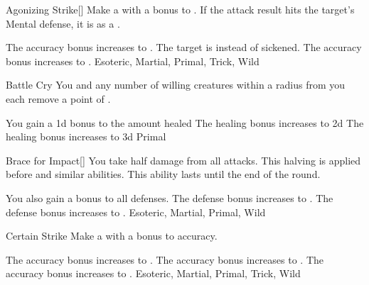 
\lowercase{\hypertarget{maneuver:Agonizing Strike}{}}\label{maneuver:Agonizing Strike}
\hypertarget{maneuver:Agonizing Strike}{}
\begin{apability}{Agonizing Strike}[]
Make a  with a  bonus to .
If the attack result hits the target's Mental defense,
it is  as a .

\rankline
{} The accuracy bonus increases to .
 The target is  instead of sickened.
 The accuracy bonus increases to .
 Esoteric, Martial, Primal, Trick, Wild
\end{apability}
\vspace{0.25em}



\lowercase{\hypertarget{maneuver:Battle Cry}{}}\label{maneuver:Battle Cry}
\hypertarget{maneuver:Battle Cry}{}
\begin{apability}{Battle Cry}
You and any number of willing creatures within a \arealarge radius from you
each remove a point of .

\rankline
{} You gain a \plus1d bonus to the amount healed
 The healing bonus increases to \plus2d
 The healing bonus increases to \plus3d
 Primal
\end{apability}
\vspace{0.25em}



\lowercase{\hypertarget{maneuver:Brace for Impact}{}}\label{maneuver:Brace for Impact}
\hypertarget{maneuver:Brace for Impact}{}
\begin{freeability}{Brace for Impact}[]
You take half damage from all attacks.
This halving is applied before  and similar abilities.
This ability lasts until the end of the round.

\rankline
{} You also gain a  bonus to all defenses.
 The defense bonus increases to .
 The defense bonus increases to .
 Esoteric, Martial, Primal, Wild
\end{freeability}
\vspace{0.25em}



\lowercase{\hypertarget{maneuver:Certain Strike}{}}\label{maneuver:Certain Strike}
\hypertarget{maneuver:Certain Strike}{}
\begin{apability}{Certain Strike}
Make a  with a  bonus to accuracy.

\rankline
{} The accuracy bonus increases to .
 The accuracy bonus increases to .
 The accuracy bonus increases to .
 Esoteric, Martial, Primal, Trick, Wild
\end{apability}
\vspace{0.25em}



